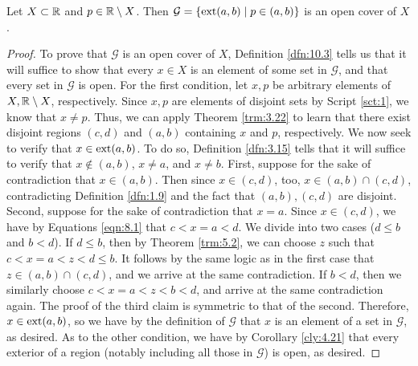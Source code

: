\documentclass[../main.tex]{subfiles}
\begin{document}
\begin{lemma}\label{lem:10.10}
    Let $X\subset\mathbb{R}$ and $p\in\mathbb{R}\setminus X$. Then $\mathcal{G}=\{\operatorname{ext}(a,b)\mid p\in(a,b)\}$ is an open cover of $X$.
    \begin{proof}
        To prove that $\mathcal{G}$ is an open cover of $X$, Definition \ref{dfn:10.3} tells us that it will suffice to show that every $x\in X$ is an element of some set in $\mathcal{G}$, and that every set in $\mathcal{G}$ is open. For the first condition, let $x,p$ be arbitrary elements of $X,\mathbb{R}\setminus X$, respectively. Since $x,p$ are elements of disjoint sets by Script \ref{sct:1}, we know that $x\neq p$. Thus, we can apply Theorem \ref{trm:3.22} to learn that there exist disjoint regions $(c,d)$ and $(a,b)$ containing $x$ and $p$, respectively. We now seek to verify that $x\in\operatorname{ext}(a,b)$. To do so, Definition \ref{dfn:3.15} tells that it will suffice to verify that $x\notin(a,b)$, $x\neq a$, and $x\neq b$. First, suppose for the sake of contradiction that $x\in(a,b)$. Then since $x\in(c,d)$, too, $x\in(a,b)\cap(c,d)$, contradicting Definition \ref{dfn:1.9} and the fact that $(a,b),(c,d)$ are disjoint. Second, suppose for the sake of contradiction that $x=a$. Since $x\in(c,d)$, we have by Equations \ref{eqn:8.1} that $c<x=a<d$. We divide into two cases ($d\leq b$ and $b<d$). If $d\leq b$, then by Theorem \ref{trm:5.2}, we can choose $z$ such that $c<x=a<z<d\leq b$. It follows by the same logic as in the first case that $z\in(a,b)\cap(c,d)$, and we arrive at the same contradiction. If $b<d$, then we similarly choose $c<x=a<z<b<d$, and arrive at the same contradiction again. The proof of the third claim is symmetric to that of the second. Therefore, $x\in\operatorname{ext}(a,b)$, so we have by the definition of $\mathcal{G}$ that $x$ is an element of a set in $\mathcal{G}$, as desired. As to the other condition, we have by Corollary \ref{cly:4.21} that every exterior of a region (notably including all those in $\mathcal{G}$) is open, as desired.
    \end{proof}
\end{lemma}
\end{document}
